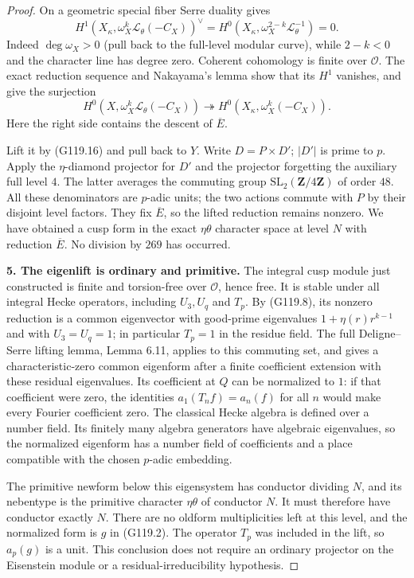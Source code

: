 \begin{proof}
On a geometric special fiber Serre duality gives
\[
 H^1(X_\kappa,\omega_X^k\mathcal L_\theta(-C_X))^\vee
 =H^0(X_\kappa,\omega_X^{2-k}\mathcal L_\theta^{-1})=0.
 \tag{G119.15}
\]
Indeed $\deg\omega_X>0$ (pull back to the full-level modular
curve), while $2-k<0$ and the character line has degree zero.
Coherent cohomology is finite over $\mathcal O$.
The exact reduction sequence and Nakayama's lemma show that its
$H^1$ vanishes, and give the surjection
\[
 H^0(X,\omega_X^k\mathcal L_\theta(-C_X))
 \twoheadrightarrow
 H^0(X_\kappa,\omega_X^k(-C_X)).
 \tag{G119.16}
\]
Here the right side contains the descent of $\overline E$.

Lift it by (G119.16) and pull back to $Y$.
Write $D=P\times D'$; $|D'|$ is prime to $p$.
Apply the $\eta$-diamond projector for $D'$ and the projector
forgetting the auxiliary full level $4$.
The latter averages the commuting group
$\mathrm{SL}_2(\mathbf Z/4\mathbf Z)$ of order $48$.
All these denominators are $p$-adic units; the two actions commute
with $P$ by their disjoint level factors.
They fix $\overline E$, so the lifted reduction remains nonzero.
We have obtained a cusp form in the exact $\eta\theta$ character
space at level $N$ with reduction $\overline E$.
No division by $269$ has occurred.

\textbf{5. The eigenlift is ordinary and primitive.}
The integral cusp module just constructed is finite and
torsion-free over $\mathcal O$, hence free.
It is stable under all integral Hecke operators, including
$U_3,U_q$ and $T_p$.
By (G119.8), its nonzero reduction is a common eigenvector with
good-prime eigenvalues $1+\eta(r)r^{k-1}$ and with
$U_3=U_q=1$; in particular $T_p=1$ in the residue field.
The full Deligne--Serre lifting lemma, Lemma 6.11, applies to this
commuting set, and gives a characteristic-zero common eigenform
after a finite coefficient extension with these residual
eigenvalues.  Its coefficient at $Q$ can be normalized to $1$:
if that coefficient were zero, the identities
$a_1(T_n f)=a_n(f)$ for all $n$ would make every Fourier
coefficient zero.
The classical Hecke algebra is defined over a number field.
Its finitely many algebra generators have algebraic eigenvalues,
so the normalized eigenform has a number field of coefficients
and a place compatible with the chosen $p$-adic embedding.

The primitive newform below this eigensystem has conductor
dividing $N$, and its nebentype is the primitive character
$\eta\theta$ of conductor $N$.
It must therefore have conductor exactly $N$.
There are no oldform multiplicities left at this level, and the
normalized form is $g$ in (G119.2).
The operator $T_p$ was included in the lift, so $a_p(g)$ is a
unit.  This conclusion does not require an ordinary projector on
the Eisenstein module or a residual-irreducibility hypothesis.


\end{proof}
